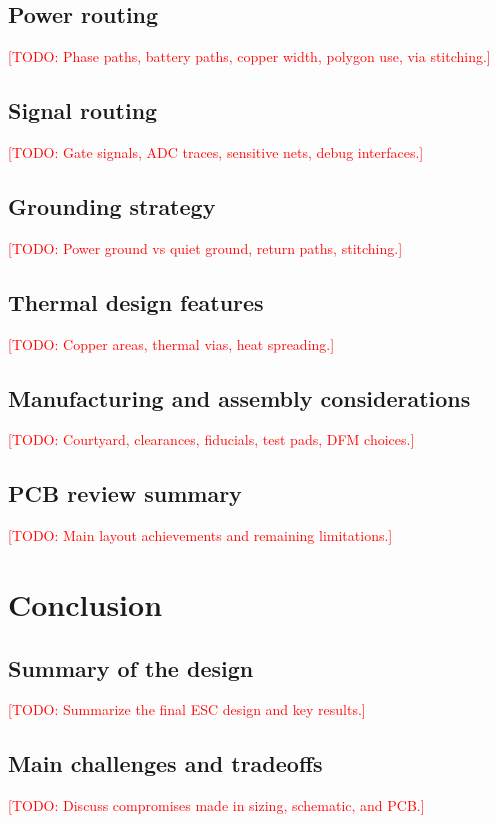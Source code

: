 \documentclass[11pt,a4paper]{article}
\newcommand{\todo}[1]{\textcolor{red}{[TODO: #1]}}
\begin{document}
\subsection{Power routing}
\todo{Phase paths, battery paths, copper width, polygon use, via stitching.}

\subsection{Signal routing}
\todo{Gate signals, ADC traces, sensitive nets, debug interfaces.}

\subsection{Grounding strategy}
\todo{Power ground vs quiet ground, return paths, stitching.}

\subsection{Thermal design features}
\todo{Copper areas, thermal vias, heat spreading.}

\subsection{Manufacturing and assembly considerations}
\todo{Courtyard, clearances, fiducials, test pads, DFM choices.}

\subsection{PCB review summary}
\todo{Main layout achievements and remaining limitations.}

\section{Conclusion}
\label{sec:conclusion}

\subsection{Summary of the design}
\todo{Summarize the final ESC design and key results.}

\subsection{Main challenges and tradeoffs}
\todo{Discuss compromises made in sizing, schematic, and PCB.}
\end{document}
